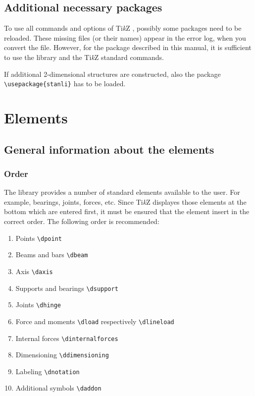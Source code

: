 \documentclass[%
  a4paper,
  BCOR20mm,
  pointlessnumbers,
  twoside,
  halfparskip,
  openright,
]{scrreprt}
\newcommand{\tikzsym}{Ti\emph{k}Z }
\begin{document}
\section{Additional necessary packages}
\label{sec:WeitereNotwendigePackages}

To use all commands and options of \tikzsym, possibly some packages need to be reloaded. These missing files (or their names) appear in the error log, when you convert the file. However, for the package described in this manual, it is sufficient to use the library and the \tikzsym standard commands.

If additional 2-dimensional structures are constructed, also the package \lstinline|\usepackage{stanli}| has to be loaded.


\chapter{Elements}
\label{sec:Elemente}


\section{General information about the elements}
\label{sec:AllgemeinesZuDenElementen}
\subsection{Order}
\label{sec:Reihenfolge}

The library provides a number of standard elements available to the user. For example, bearings, joints, forces, etc. Since \tikzsym displayes those elements at the bottom which are entered first, it must be ensured that the element insert in the correct order. The following order is recommended:

\begin{enumerate}
	\item Points \lstinline|\dpoint|
	\item Beams and bars \lstinline|\dbeam|
	\item Axis \lstinline|\daxis|
	\item Supports and bearings \lstinline|\dsupport|
	\item Joints \lstinline|\dhinge|
	\item Force and moments \lstinline|\dload| respectively \lstinline|\dlineload|
	\item Internal forces \lstinline|\dinternalforces|
	\item Dimensioning \lstinline|\ddimensioning|
	\item Labeling \lstinline|\dnotation|
	\item Additional symbols \lstinline|\daddon|
\end{enumerate}
\end{document}
